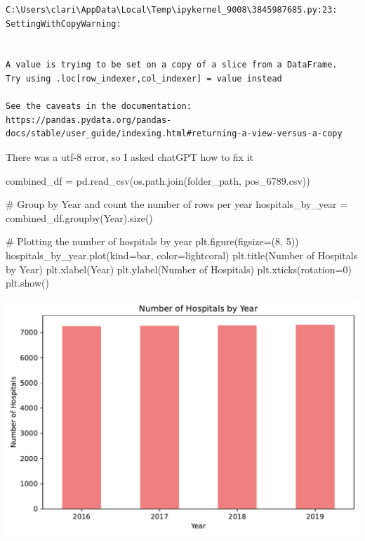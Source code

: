 \documentclass[
  letterpaper,
  DIV=11,
  numbers=noendperiod]{scrartcl}
\newenvironment{Shaded}{\begin{snugshade}}{\end{snugshade}}
\newcommand{\CommentTok}[1]{\textcolor[rgb]{0.37,0.37,0.37}{#1}}
\newcommand{\DecValTok}[1]{\textcolor[rgb]{0.68,0.00,0.00}{#1}}
\newcommand{\NormalTok}[1]{\textcolor[rgb]{0.00,0.23,0.31}{#1}}
\newcommand{\OperatorTok}[1]{\textcolor[rgb]{0.37,0.37,0.37}{#1}}
\newcommand{\StringTok}[1]{\textcolor[rgb]{0.13,0.47,0.30}{#1}}
\begin{document}
\begin{verbatim}
C:\Users\clari\AppData\Local\Temp\ipykernel_9008\3845987685.py:23: SettingWithCopyWarning:


A value is trying to be set on a copy of a slice from a DataFrame.
Try using .loc[row_indexer,col_indexer] = value instead

See the caveats in the documentation: https://pandas.pydata.org/pandas-docs/stable/user_guide/indexing.html#returning-a-view-versus-a-copy
\end{verbatim}

There was a utf-8 error, so I asked chatGPT how to fix it

\begin{Shaded}
\begin{Highlighting}[]
\NormalTok{combined\_df }\OperatorTok{=}\NormalTok{ pd.read\_csv(os.path.join(folder\_path, }\StringTok{\textquotesingle{}pos\_6789.csv\textquotesingle{}}\NormalTok{))}

\CommentTok{\# Group by \textquotesingle{}Year\textquotesingle{} and count the number of rows per year}
\NormalTok{hospitals\_by\_year }\OperatorTok{=}\NormalTok{ combined\_df.groupby(}\StringTok{\textquotesingle{}Year\textquotesingle{}}\NormalTok{).size()}

\CommentTok{\# Plotting the number of hospitals by year}
\NormalTok{plt.figure(figsize}\OperatorTok{=}\NormalTok{(}\DecValTok{8}\NormalTok{, }\DecValTok{5}\NormalTok{))}
\NormalTok{hospitals\_by\_year.plot(kind}\OperatorTok{=}\StringTok{\textquotesingle{}bar\textquotesingle{}}\NormalTok{, color}\OperatorTok{=}\StringTok{\textquotesingle{}lightcoral\textquotesingle{}}\NormalTok{)}
\NormalTok{plt.title(}\StringTok{\textquotesingle{}Number of Hospitals by Year\textquotesingle{}}\NormalTok{)}
\NormalTok{plt.xlabel(}\StringTok{\textquotesingle{}Year\textquotesingle{}}\NormalTok{)}
\NormalTok{plt.ylabel(}\StringTok{\textquotesingle{}Number of Hospitals\textquotesingle{}}\NormalTok{)}
\NormalTok{plt.xticks(rotation}\OperatorTok{=}\DecValTok{0}\NormalTok{)}
\NormalTok{plt.show()}
\end{Highlighting}
\end{Shaded}

\includegraphics{pset4_ANSWERS_files/figure-pdf/cell-6-output-1.pdf}
\end{document}
